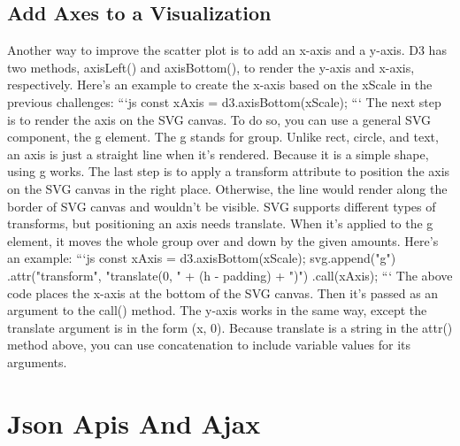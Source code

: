 \documentclass{article}%
\begin{document}
\subsection{Add Axes to a Visualization}%
\label{subsec:AddAxestoaVisualization}%
Another way to improve the scatter plot is to add an x{-}axis and a y{-}axis.\newline%
D3 has two methods, axisLeft() and axisBottom(), to render the y{-}axis and x{-}axis, respectively. Here's an example to create the x{-}axis based on the xScale in the previous challenges:\newline%
```js\newline%
const xAxis = d3.axisBottom(xScale);\newline%
```\newline%
The next step is to render the axis on the SVG canvas. To do so, you can use a general SVG component, the g element. The g stands for group.\newline%
Unlike rect, circle, and text, an axis is just a straight line when it's rendered. Because it is a simple shape, using g works.\newline%
The last step is to apply a transform attribute to position the axis on the SVG canvas in the right place. Otherwise, the line would render along the border of SVG canvas and wouldn't be visible.\newline%
SVG supports different types of transforms, but positioning an axis needs translate. When it's applied to the g element, it moves the whole group over and down by the given amounts. Here's an example:\newline%
```js\newline%
const xAxis = d3.axisBottom(xScale);\newline%
svg.append("g")\newline%
   .attr("transform", "translate(0, " + (h {-} padding) + ")")\newline%
   .call(xAxis);\newline%
```\newline%
The above code places the x{-}axis at the bottom of the SVG canvas. Then it's passed as an argument to the call() method.\newline%
The y{-}axis works in the same way, except the translate argument is in the form (x, 0). Because translate is a string in the attr() method above, you can use concatenation to include variable values for its arguments.\newline%

%
\newpage%
\section{Json Apis And Ajax}%
\label{sec:JsonApisAndAjax}%
\end{document}
